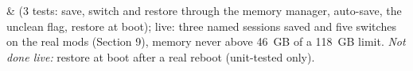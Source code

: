 \ok &  (3 tests: save, switch and restore through the memory manager, auto-save, the unclean flag, restore at boot); live: three named sessions saved and five switches on the real mods (Section 9), memory never above 46~GB of a 118~GB limit. \emph{Not done live:} restore at boot after a real reboot (unit-tested only).
